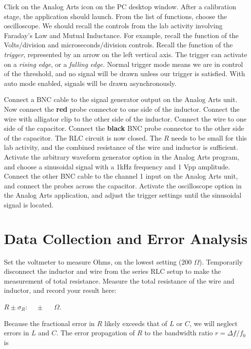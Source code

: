 \documentclass[12pt,twocolumn]{article}
\begin{document}
Click on the Analog Arts icon on the PC desktop window.  After a calibration stage, the application should launch.  From the list of functions, choose the oscilloscope.  We should recall the controls from the lab activity involving Faraday's Law and Mutual Inductance.  For example, recall the function of the Volts/division and microseconds/division controls.  Recall the function of the \textit{trigger}, represented by an arrow on the left vertical axis.  The trigger can activate on a \textit{rising edge}, or a \textit{falling edge.}  Normal trigger mode means we are in control of the threshold, and no signal will be drawn unless our trigger is satisfied.  With auto mode enabled, signals will be drawn asynchronously.

Connect a BNC cable to the signal generator output on the Analog Arts unit.  Now connect the \textbf{red} probe connector to one side of the inductor.  Connect the wire with alligator clip to the other side of the inductor.  Connect the wire to one side of the capacitor.  Connect the \textbf{black} BNC probe connector to the other side of the capacitor.  The RLC circuit is now closed.  The $R$ needs to be small for this lab activity, and the combined resistance of the wire and inductor is sufficient.  Activate the arbitrary waveform generator option in the Analog Arts program, and choose a sinusoidal signal with a 1kHz frequency and 1 Vpp amplitude.   Connect the other BNC cable to the channel 1 input on the Analog Arts unit, and connect the probes across the capacitor.  Activate the oscilloscope option in the Analog Arts application, and adjust the trigger settings until the sinusoidal signal is located.

\section{Data Collection and Error Analysis}

Set the voltmeter to measure Ohms, on the lowest setting ($200$ $\Omega$).  Temporarily disconnect the inductor and wire from the series RLC setup to make the measurement of total resistance.  Measure the total resistance of the wire and inductor, and record your result here: \\ \vspace{0.5cm}

\underline{$R\pm \sigma_R: ~~~~~ \pm ~~~~~$} $\Omega$. \\ \vspace{0.5cm}

Because the fractional error in $R$ likely exceeds that of $L$ or $C$, we will neglect errors in $L$ and $C$.  The error propagation of $R$ to the bandwidth ratio $r = \Delta f/f_0$ is
\end{document}
